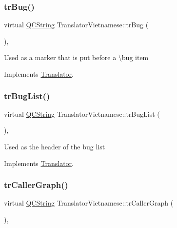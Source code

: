 \mbox{\label{class_translator_vietnamese_a22e633ef89df53443bc0d91eeb6196cb}} 
\subsubsection{\texorpdfstring{trBug()}{trBug()}}
{\footnotesize\ttfamily virtual \mbox{\hyperlink{class_q_c_string}{Q\+C\+String}} Translator\+Vietnamese\+::tr\+Bug (\begin{DoxyParamCaption}{ }\end{DoxyParamCaption})\hspace{0.3cm}{\ttfamily [inline]}, {\ttfamily [virtual]}}

Used as a marker that is put before a \textbackslash{}bug item 

Implements \mbox{\hyperlink{class_translator}{Translator}}.

\mbox{\label{class_translator_vietnamese_ad1d04af6121febe4a12a59325064a944}} 
\subsubsection{\texorpdfstring{trBugList()}{trBugList()}}
{\footnotesize\ttfamily virtual \mbox{\hyperlink{class_q_c_string}{Q\+C\+String}} Translator\+Vietnamese\+::tr\+Bug\+List (\begin{DoxyParamCaption}{ }\end{DoxyParamCaption})\hspace{0.3cm}{\ttfamily [inline]}, {\ttfamily [virtual]}}

Used as the header of the bug list 

Implements \mbox{\hyperlink{class_translator}{Translator}}.

\mbox{\label{class_translator_vietnamese_a4ce284193b5fe011519621c28e60037c}} 
\subsubsection{\texorpdfstring{trCallerGraph()}{trCallerGraph()}}
{\footnotesize\ttfamily virtual \mbox{\hyperlink{class_q_c_string}{Q\+C\+String}} Translator\+Vietnamese\+::tr\+Caller\+Graph (\begin{DoxyParamCaption}{ }\end{DoxyParamCaption})\hspace{0.3cm}{\ttfamily [inline]}, {\ttfamily [virtual]}}

